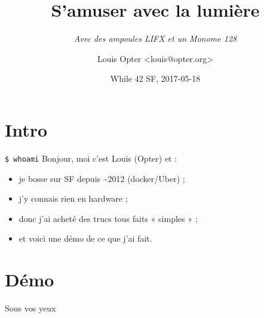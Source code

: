 \documentclass{lgtdslides}
\title{S'amuser avec la lumière}
\subtitle{\textit{Avec des ampoules LIFX et un Monome 128}}
\date{While 42 SF, 2017-05-18}
\author{Louis Opter <louis@opter.org>}
\begin{document}
\begin{frame}\titlepage\end{frame}

\section{Intro}

\begin{frame}{\LARGE{\texttt{\$ whoami}}}
Bonjour, moi c'est Louis (Opter) et :\vspace{1em}
\begin{itemize}
\item je bosse sur SF depuis \textasciitilde2012 (docker/Uber) ;
\item j'y connais rien en hardware ;
\item donc j'ai acheté des trucs tous faits « simples » ;
\item et voici une démo de ce que j'ai fait.
\end{itemize}
\end{frame}

\section{Démo}

\begin{frame}{Sous vos yeux}
\begin{center}
\end{center}
\end{frame}
\end{document}

